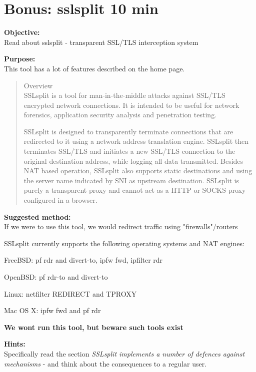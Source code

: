 \documentclass[a4paper,11pt,notitlepage]{report}
\begin{document}
\chapter{Bonus: sslsplit 10 min}
\label{ex:sslsplit}

{\bf Objective:}\\
Read about sslsplit 
- transparent SSL/TLS interception system

{\bf Purpose:}\\
This tool has a lot of features described on the home page.

\begin{quote}\small
Overview\\
SSLsplit is a tool for man-in-the-middle attacks against SSL/TLS encrypted network connections. It is intended to be useful for network forensics, application security analysis and penetration testing.

SSLsplit is designed to transparently terminate connections that are redirected to it using a network address translation engine. SSLsplit then terminates SSL/TLS and initiates a new SSL/TLS connection to the original destination address, while logging all data transmitted. Besides NAT based operation, SSLsplit also supports static destinations and using the server name indicated by SNI as upstream destination. SSLsplit is purely a transparent proxy and cannot act as a HTTP or SOCKS proxy configured in a browser.
\end{quote}

{\bf Suggested method:}\\
If we were to use this tool, we would redirect traffic using "firewalls"/routers

\begin{list2}
\item SSLsplit currently supports the following operating systems and NAT engines:
\item FreeBSD: pf rdr and divert-to, ipfw fwd, ipfilter rdr
\item OpenBSD: pf rdr-to and divert-to
\item Linux: netfilter REDIRECT and TPROXY
\item Mac OS X: ipfw fwd and pf rdr
\end{list2}

{\bf We wont run this tool, but beware such tools exist}

{\bf Hints:}\\
Specifically read the section \emph{SSLsplit implements a number of defences against mechanisms} - and think about the consequences to a regular user.
\end{document}
